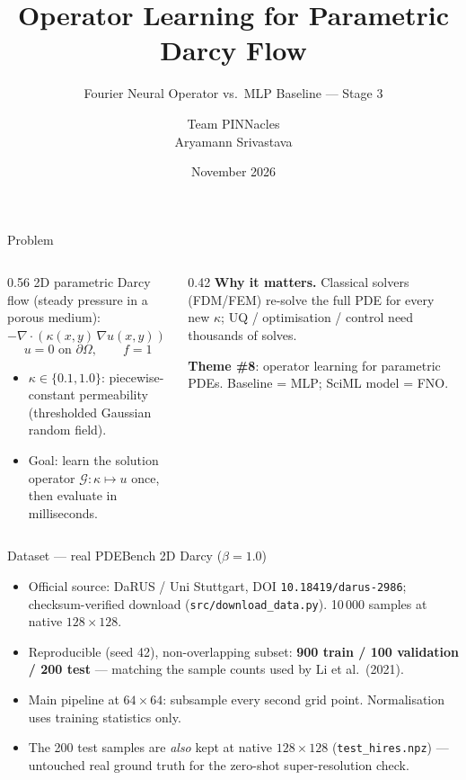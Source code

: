 \documentclass[aspectratio=169,11pt]{beamer}
\title[FNO for Parametric Darcy Flow]{Operator Learning for Parametric Darcy Flow}
\subtitle{Fourier Neural Operator vs.\ MLP Baseline --- Stage 3}
\author[Team PINNacles]{Team PINNacles \\ \small Aryamann Srivastava}
\institute[IIT Kanpur]{AE646: Scientific Machine Learning for Fluid Mechanics \\ Department of Aerospace Engineering, IIT Kanpur}
\date{November 2026}
\begin{document}
\begin{frame}\titlepage\end{frame}

\begin{frame}{Problem}
\begin{columns}
\begin{column}{0.56\textwidth}
2D parametric Darcy flow (steady pressure in a porous medium):
\[ -\nabla\cdot(\kappa(x,y)\,\nabla u(x,y)) = f,\quad (x,y)\in(0,1)^2 \]
\[ u = 0 \text{ on } \partial\Omega,\qquad f = 1 \]
\begin{itemize}
  \item $\kappa\in\{0.1,1.0\}$: piecewise-constant permeability (thresholded Gaussian random field).
  \item Goal: learn the solution operator $\mathcal{G}:\kappa \mapsto u$ once, then evaluate in milliseconds.
\end{itemize}
\end{column}
\begin{column}{0.42\textwidth}
\footnotesize
\textbf{Why it matters.} Classical solvers (FDM/FEM) re-solve the full PDE for every new $\kappa$; UQ / optimisation / control need thousands of solves.
\medskip

\textbf{Theme \#8}: operator learning for parametric PDEs. Baseline = MLP; SciML model = FNO.
\end{column}
\end{columns}
\end{frame}

\begin{frame}{Dataset --- real PDEBench 2D Darcy ($\beta=1.0$)}
\begin{itemize}
  \item Official source: DaRUS / Uni Stuttgart, DOI \texttt{10.18419/darus-2986}; checksum-verified download (\texttt{src/download\_data.py}). 10\,000 samples at native $128\times128$.
  \item Reproducible (seed 42), non-overlapping subset: \textbf{900 train / 100 validation / 200 test} --- matching the sample counts used by Li et al.\ (2021).
  \item Main pipeline at $64\times64$: subsample every second grid point. Normalisation uses training statistics only.
  \item The 200 test samples are \emph{also} kept at native $128\times128$ (\texttt{test\_hires.npz}) --- untouched real ground truth for the zero-shot super-resolution check.
\end{itemize}
\end{frame}
\end{document}
